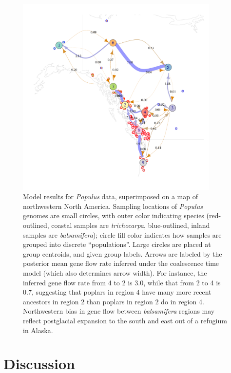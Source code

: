 \documentclass{article}
\begin{document}
\begin{figure}
\centering
    \includegraphics[width=0.9\textwidth]{poplars/grid_populus_map}
    \caption{
        Model results for \textit{Populus} data,
        superimposed on a map of northwestern North America.
        Sampling locations of \textit{Populus} genomes are small circles,
        with outer color indicating species 
        (red-outlined, coastal samples are \textit{trichocarpa}, 
        blue-outlined, inland samples are \textit{balsamifera});
        circle fill color indicates how samples are grouped into discrete ``populations''.
        Large circles are placed at group centroids, and given group labels.
        Arrows are labeled by the posterior mean gene flow rate inferred under
        the coalescence time model (which also determines arrow width).
        For instance, the inferred gene flow rate from 4 to 2 is 3.0,
        while that from 2 to 4 is 0.7,
        suggesting that poplars in region 4
        have many more recent ancestors in region 2
        than poplars in region 2 do in region 4.
        Northwestern bias in gene flow between \textit{balsamifera} regions
        may reflect postglacial expansion to the south and east out of a refugium in Alaska.
        \label{fig:poplar_results}
    }
\end{figure}

\section*{Discussion}
\end{document}
